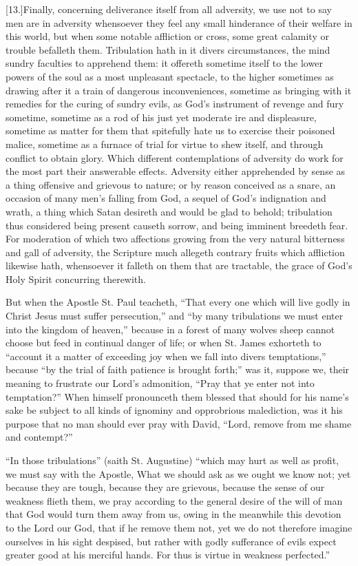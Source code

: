 [13.]Finally, concerning deliverance itself from all adversity, we use not to say men are in adversity whensoever they feel any small hinderance of their welfare in this world, but when some notable affliction or cross, some great calamity or trouble befalleth them. Tribulation hath in it divers circumstances, the mind sundry faculties to apprehend them: it offereth sometime itself to the lower powers of the soul as a most unpleasant spectacle, to the higher sometimes as drawing after it a train of dangerous inconveniences, sometime as bringing with it remedies for the curing of sundry evils, as God’s instrument of revenge and fury sometime, sometime as a rod of his just yet moderate ire and displeasure, sometime as matter for them that spitefully hate us to exercise their poisoned malice, sometime as a furnace of trial for virtue to shew itself, and through conflict to obtain glory. Which different contemplations of adversity do work  for the most part their answerable effects. Adversity either apprehended by sense as a thing offensive and grievous to nature; or by reason conceived as a snare, an occasion of many men’s falling from God, a sequel of God’s indignation and wrath, a thing which Satan desireth and would be glad to behold; tribulation thus considered being present causeth sorrow, and being imminent breedeth fear. For moderation of which two affections growing from the very natural bitterness and gall of adversity, the Scripture much allegeth contrary fruits which affliction likewise hath, whensoever it falleth on them that are tractable, the grace of God’s Holy Spirit concurring therewith.

But when the Apostle St. Paul teacheth, “That every one which will live godly in Christ Jesus must suffer persecution,” and “by many tribulations we must enter into the kingdom of heaven,” because in a forest of many wolves sheep cannot choose but feed in continual danger of life; or when St. James exhorteth to “account it a matter of exceeding joy when we fall into divers temptations,” because “by the trial of faith patience is brought forth;” was it, suppose we, their meaning to frustrate our Lord’s admonition, “Pray that ye enter not into temptation?” When himself pronounceth them blessed that should for his name’s sake be subject to all kinds of ignominy and opprobrious malediction, was it his purpose that no man should ever pray with David, “Lord, remove from me shame and contempt?”

“In those tribulations” (saith St. Augustine) “which may hurt as well as profit, we must say with the Apostle, What we should ask as we ought we know not; yet because they are tough, because they are grievous, because the sense of our weakness flieth them, we pray according to the  general desire of the will of man that God would turn them away from us,
 owing in the meanwhile this devotion to the Lord our God, that if he remove them not, yet we do not therefore imagine ourselves in his sight despised, but rather with godly sufferance of evils expect greater good at his merciful hands. For thus is virtue in weakness perfected.”

